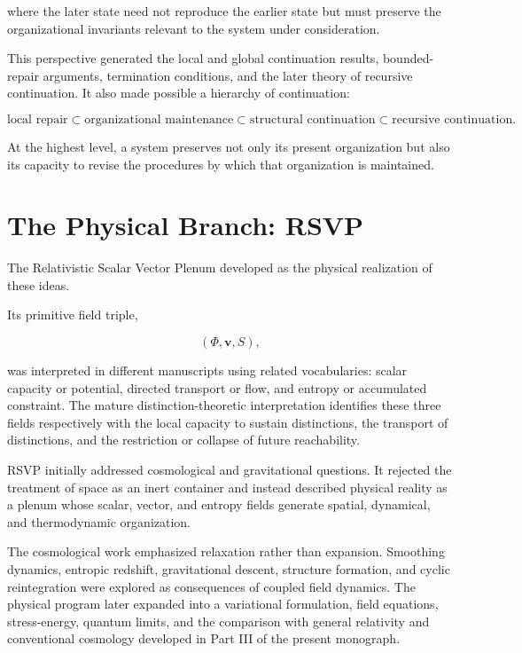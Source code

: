 \documentclass[11pt,oneside]{book}
\numberwithin{equation}{chapter}
\theoremstyle{definition}
\theoremstyle{plain}
\begin{document}
where the later state need not reproduce the earlier state but must
preserve the organizational invariants relevant to the system under
consideration.

This perspective generated the local and global continuation results,
bounded-repair arguments, termination conditions, and the later theory of
recursive continuation. It also made possible a hierarchy of continuation:

\[
\text{local repair}
\subset
\text{organizational maintenance}
\subset
\text{structural continuation}
\subset
\text{recursive continuation}.
\]

At the highest level, a system preserves not only its present organization
but also its capacity to revise the procedures by which that organization
is maintained.

\section{The Physical Branch: RSVP}

The Relativistic Scalar Vector Plenum developed as the physical realization
of these ideas.

Its primitive field triple,

\[
(\Phi,\mathbf v,S),
\]

was interpreted in different manuscripts using related vocabularies: scalar
capacity or potential, directed transport or flow, and entropy or
accumulated constraint. The mature distinction-theoretic interpretation
identifies these three fields respectively with the local capacity to
sustain distinctions, the transport of distinctions, and the restriction or
collapse of future reachability.

RSVP initially addressed cosmological and gravitational questions. It
rejected the treatment of space as an inert container and instead described
physical reality as a plenum whose scalar, vector, and entropy fields
generate spatial, dynamical, and thermodynamic organization.

The cosmological work emphasized relaxation rather than expansion.
Smoothing dynamics, entropic redshift, gravitational descent, structure
formation, and cyclic reintegration were explored as consequences of
coupled field dynamics. The physical program later expanded into a
variational formulation, field equations, stress-energy, quantum limits,
and the comparison with general relativity and conventional cosmology
developed in Part III of the present monograph.
\end{document}

